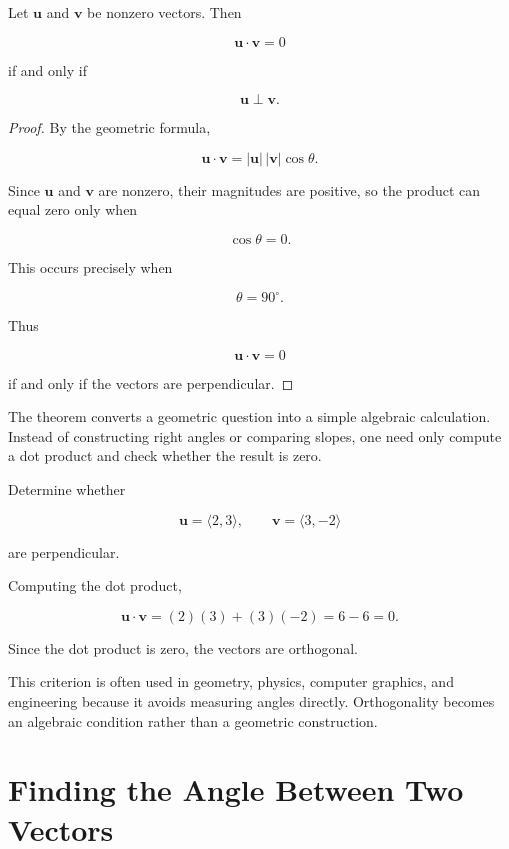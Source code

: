 \begin{theorem}
Let $\mathbf{u}$ and $\mathbf{v}$ be nonzero vectors. Then

\[
\mathbf{u}\cdot\mathbf{v}=0
\]

if and only if

\[
\mathbf{u}\perp\mathbf{v}.
\]
\end{theorem}

\begin{proof}
By the geometric formula,

\[
\mathbf{u}\cdot\mathbf{v}
=
|\mathbf{u}|\,|\mathbf{v}|\cos\theta.
\]

Since $\mathbf{u}$ and $\mathbf{v}$ are nonzero, their magnitudes are
positive, so the product can equal zero only when

\[
\cos\theta=0.
\]

This occurs precisely when

\[
\theta=90^\circ.
\]

Thus

\[
\mathbf{u}\cdot\mathbf{v}=0
\]

if and only if the vectors are perpendicular.
\end{proof}

The theorem converts a geometric question into a simple algebraic
calculation. Instead of constructing right angles or comparing slopes, one
need only compute a dot product and check whether the result is zero.

\begin{example}
Determine whether

\[
\mathbf{u}
=
\langle 2,3\rangle,
\qquad
\mathbf{v}
=
\langle 3,-2\rangle
\]

are perpendicular.

Computing the dot product,

\[
\mathbf{u}\cdot\mathbf{v}
=
(2)(3)+(3)(-2)
=
6-6
=
0.
\]

Since the dot product is zero, the vectors are orthogonal.
\end{example}

This criterion is often used in geometry, physics, computer graphics, and
engineering because it avoids measuring angles directly. Orthogonality
becomes an algebraic condition rather than a geometric construction.

\section{Finding the Angle Between Two Vectors}

